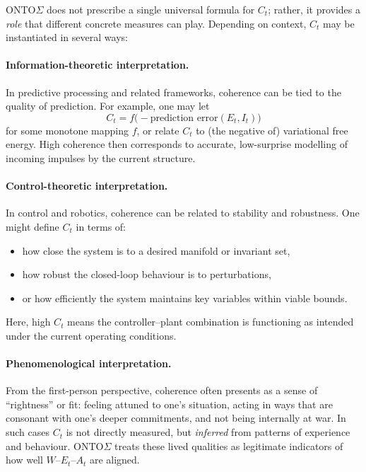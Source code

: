 \documentclass[12pt,a4paper]{report}
\newcommand{\Will}{W}
\newcommand{\Struct}{E}
\newcommand{\Act}{A}
\begin{document}
ONTO$\Sigma$ does not prescribe a single universal formula for \(C_t\); rather, it provides a \emph{role} that different concrete measures can play. Depending on context, \(C_t\) may be instantiated in several ways:

\paragraph{Information-theoretic interpretation.} In predictive processing and related frameworks, coherence can be tied to the quality of prediction. For example, one may let
\[
    C_t = f\bigl(-\text{prediction error}(E_t, I_t)\bigr)
\]
for some monotone mapping \(f\), or relate \(C_t\) to (the negative of) variational free energy. High coherence then corresponds to accurate, low-surprise modelling of incoming impulses by the current structure.

\paragraph{Control-theoretic interpretation.} In control and robotics, coherence can be related to stability and robustness. One might define \(C_t\) in terms of:

\begin{itemize}[leftmargin=2em]
    \item how close the system is to a desired manifold or invariant set,
    \item how robust the closed-loop behaviour is to perturbations,
    \item or how efficiently the system maintains key variables within viable bounds.
\end{itemize}

Here, high \(C_t\) means the controller--plant combination is functioning as intended under the current operating conditions.

\paragraph{Phenomenological interpretation.} From the first-person perspective, coherence often presents as a sense of ``rightness'' or fit: feeling attuned to one's situation, acting in ways that are consonant with one's deeper commitments, and not being internally at war. In such cases \(C_t\) is not directly measured, but \emph{inferred} from patterns of experience and behaviour. ONTO$\Sigma$ treats these lived qualities as legitimate indicators of how well \(\Will\)–\(\Struct_t\)–\(\Act_t\) are aligned.
\end{document}
